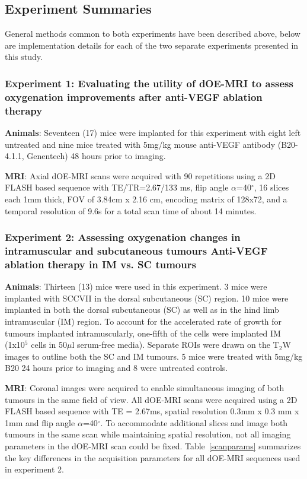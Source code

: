 \subsection{Experiment Summaries}
General methods common to both experiments have been described above, below are implementation details for each of the two separate experiments presented in this study.

\subsubsection{Experiment 1: Evaluating the utility of dOE-MRI to assess oxygenation improvements after anti-VEGF ablation therapy}
\label{sec:B20_expt1}
\noindent\textbf{Animals}: Seventeen (17) mice were implanted for this experiment with eight left untreated and nine mice treated with 5mg/kg mouse anti-VEGF antibody (B20-4.1.1, Genentech) 48 hours prior to imaging.

\noindent\textbf{MRI}: Axial \ac{dOE-MRI} scans were acquired with 90 repetitions using a 2D FLASH based sequence with TE/TR=2.67/133 ms, flip angle $\alpha$=40$^\circ$, 16 slices each 1mm thick, FOV of 3.84cm x 2.16 cm, encoding matrix of 128x72, and a temporal resolution of 9.6s for a total scan time of about 14 minutes.

\subsubsection{Experiment 2: Assessing oxygenation changes in intramuscular and subcutaneous tumours Anti-VEGF ablation therapy in \acs{IM} vs. \acs{SC} tumours}
\noindent\textbf{Animals}: Thirteen (13) mice were used in this experiment. 
3 mice were implanted with SCCVII in the dorsal subcutaneous (SC) region.
10 mice were implanted in both the dorsal subcutaneous (SC) as well as in the hind limb intramuscular (IM) region.
To account for the accelerated rate of growth for tumours implanted intramuscularly, one-fifth of the cells were implanted \acs{IM} (1x10$^5$ cells in 50$\mu$l serum-free media).
Separate ROIs were drawn on the T$_2$W images to outline both the \acs{SC} and \acs{IM} tumours.
5 mice were treated with 5mg/kg B20 24 hours prior to imaging and 8 were untreated controls.

\noindent\textbf{MRI}: Coronal images were acquired to enable simultaneous imaging of both tumours in the same field of view.
All \ac{dOE-MRI} scans were acquired using a 2D FLASH based sequence with TE = 2.67ms, spatial resolution 0.3mm x 0.3 mm x 1mm and flip angle $\alpha$=40$^\circ$.
To accommodate additional slices and image both tumours in the same scan while maintaining spatial resolution, not all imaging parameters in the \ac{dOE-MRI} scan could be fixed. 
Table~\ref{scanparams} summarizes the key differences in the acquisition parameters for all \ac{dOE-MRI} sequences used in experiment 2.

